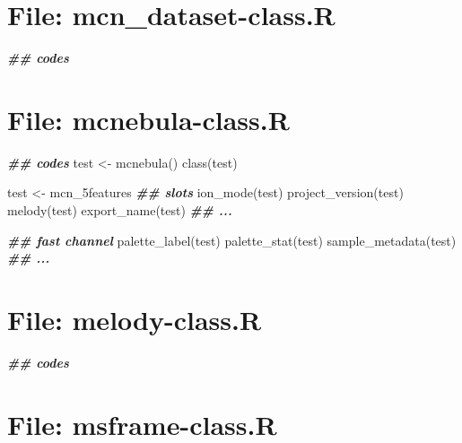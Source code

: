 \documentclass[
]{article}
\newenvironment{Shaded}{\begin{snugshade}}{\end{snugshade}}
\newcommand{\DocumentationTok}[1]{\textcolor[rgb]{0.56,0.35,0.01}{\textbf{\textit{#1}}}}
\newcommand{\FunctionTok}[1]{\textcolor[rgb]{0.00,0.00,0.00}{#1}}
\newcommand{\NormalTok}[1]{#1}
\newcommand{\OtherTok}[1]{\textcolor[rgb]{0.56,0.35,0.01}{#1}}
\begin{document}
\hypertarget{file-mcn_dataset-class.r}{%
\section{File: mcn\_dataset-class.R}\label{file-mcn_dataset-class.r}}

\begin{Shaded}
\begin{Highlighting}[]
\DocumentationTok{\#\# codes}
\end{Highlighting}
\end{Shaded}

\hypertarget{file-mcnebula-class.r}{%
\section{File: mcnebula-class.R}\label{file-mcnebula-class.r}}

\begin{Shaded}
\begin{Highlighting}[]
\DocumentationTok{\#\# codes}
\NormalTok{test }\OtherTok{\textless{}{-}} \FunctionTok{mcnebula}\NormalTok{()}
\FunctionTok{class}\NormalTok{(test)}

\NormalTok{test }\OtherTok{\textless{}{-}}\NormalTok{ mcn\_5features}
\DocumentationTok{\#\# slots}
\FunctionTok{ion\_mode}\NormalTok{(test)}
\FunctionTok{project\_version}\NormalTok{(test)}
\FunctionTok{melody}\NormalTok{(test)}
\FunctionTok{export\_name}\NormalTok{(test)}
\DocumentationTok{\#\# ...}

\DocumentationTok{\#\# \textquotesingle{}fast channel\textquotesingle{}}
\FunctionTok{palette\_label}\NormalTok{(test)}
\FunctionTok{palette\_stat}\NormalTok{(test)}
\FunctionTok{sample\_metadata}\NormalTok{(test)}
\DocumentationTok{\#\# ...}
\end{Highlighting}
\end{Shaded}

\hypertarget{file-melody-class.r}{%
\section{File: melody-class.R}\label{file-melody-class.r}}

\begin{Shaded}
\begin{Highlighting}[]
\DocumentationTok{\#\# codes}
\end{Highlighting}
\end{Shaded}

\hypertarget{file-msframe-class.r}{%
\section{File: msframe-class.R}\label{file-msframe-class.r}}
\end{document}
